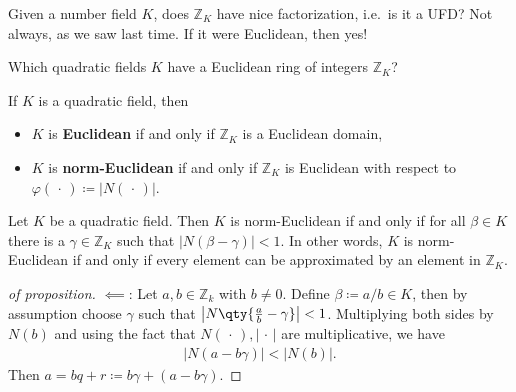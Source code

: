 \begin{remark}

Given a number field \(K\), does \({\mathbb{Z}}_K\) have nice
factorization, i.e.~is it a UFD? Not always, as we saw last time. If it
were Euclidean, then yes!

\end{remark}

\begin{question}

Which quadratic fields \(K\) have a Euclidean ring of integers
\({\mathbb{Z}}_K\)?

\end{question}

\begin{definition}

If \(K\) is a quadratic field, then

\begin{itemize}
\item
  \(K\) is \textbf{Euclidean} if and only if \({\mathbb{Z}}_K\) is a
  Euclidean domain,
\item
  \(K\) is \textbf{norm-Euclidean} if and only if \({\mathbb{Z}}_K\) is
  Euclidean with respect to
  \(\varphi({\,\cdot\,}) \coloneqq{\left\lvert {N({\,\cdot\,})} \right\rvert}\).
\end{itemize}

\end{definition}

\begin{proposition}

Let \(K\) be a quadratic field. Then \(K\) is norm-Euclidean if and only
if for all \(\beta\in K\) there is a \(\gamma\in {\mathbb{Z}}_K\) such
that \({\left\lvert { N(\beta- \gamma) } \right\rvert} < 1\). In other
words, \(K\) is norm-Euclidean if and only if every element can be
approximated by an element in \({\mathbb{Z}}_K\).

\end{proposition}

\begin{proof}[of proposition]

\(\impliedby\): Let \(a,b \in {\mathbb{Z}}_k\) with \(b\neq 0\). Define
\(\beta\coloneqq a/b \in K\), then by assumption choose \(\gamma\) such
that \({\left\lvert {N \qty{ {a\over b} - \gamma} } \right\rvert}< 1\).
Multiplying both sides by \(N(b)\) and using the fact that
\(N({\,\cdot\,}), {\left\lvert {{\,\cdot\,}} \right\rvert}\) are
multiplicative, we have
\begin{align*}
{\left\lvert {N(a - b \gamma)} \right\rvert} < {\left\lvert {N(b)} \right\rvert} 
.\end{align*}
Then \(a = bq + r \coloneqq b \gamma + (a - b \gamma)\).

\end{proof}

